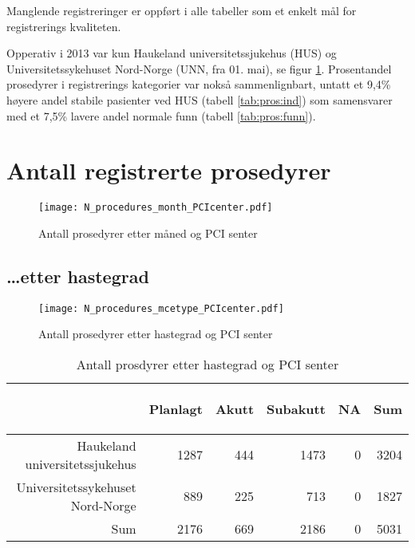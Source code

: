 \documentclass[norsk, a4paper]{report}
\begin{document}
Manglende registreringer er oppført i alle tabeller som et enkelt mål for registrerings kvaliteten.

Opperativ i 2013 var kun Haukeland universitetssjukehus (HUS) og Universitetssykehuset Nord-Norge (UNN, fra 01. mai), se figur \ref{fig:N:SHUS}. Prosentandel prosedyrer i registrerings kategorier var nokså sammenlignbart, untatt et 9,4\% høyere andel stabile pasienter ved HUS (tabell \ref{tab:pros:ind}) som samensvarer med et 7,5\% lavere andel normale funn (tabell \ref{tab:pros:funn}).



\section{Antall registrerte prosedyrer}

\begin{figure}[ht]
  \centering
  \label{fig:N:SHUS}

\texttt{[image: N\_procedures\_month\_PCIcenter.pdf]}
\caption{Antall prosedyrer etter måned og PCI senter}
\end{figure}


\clearpage
\subsection{\ldots etter hastegrad}
  
\begin{figure}[ht]
  \centering
\texttt{[image: N\_procedures\_mcetype\_PCIcenter.pdf]}\caption{Antall prosedyrer etter hastegrad og PCI senter}
\end{figure}
  

\begin{tiny}
\begin{table}[ht]
\centering
\begin{tabular}{rrrrrr}
  \toprule
 & \begin{sideways} Planlagt \end{sideways} & \begin{sideways} Akutt \end{sideways} & \begin{sideways} Subakutt \end{sideways} & \begin{sideways} NA \end{sideways} & \begin{sideways} Sum \end{sideways} \\ 
  \midrule
Haukeland universitetssjukehus & 1287 & 444 & 1473 & 0 & 3204 \\ 
  Universitetssykehuset Nord-Norge & 889 & 225 & 713 & 0 & 1827 \\ 
  Sum & 2176 & 669 & 2186 & 0 & 5031 \\ 
   \bottomrule
\end{tabular}
\caption{Antall prosdyrer etter hastegrad og PCI senter} 
\end{table}\end{tiny}
\end{document}
